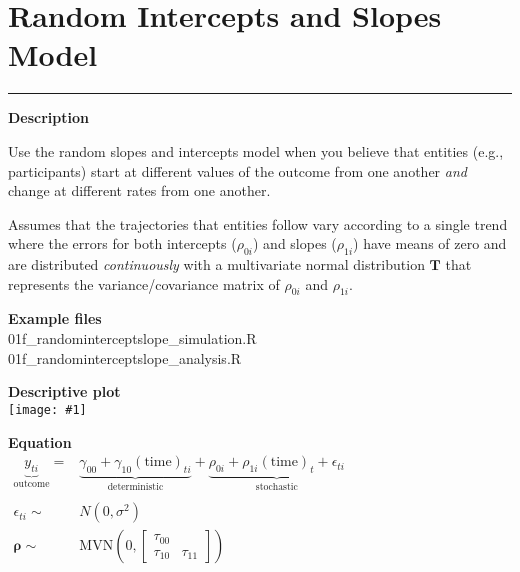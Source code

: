 \documentclass[10pt, landscape, article]{memoir}
\newcommand{\outcome}[1]{\underbrace{#1}_{\text{outcome}}}
\newcommand{\deterministic}[1]{\underbrace{#1}_{\text{deterministic}}}
\newcommand{\stochastic}[1]{\underbrace{#1}_{\text{stochastic}}}
\newenvironment{desc}{
    \begin{minipage}[t][.6\textheight][t]{.9\textwidth}
    \setlength{\parskip}{.5\baselineskip}
    \textbf{\large Description}\\\raggedright
}{
    \end{minipage}
}
\newenvironment{eqn}{
    \begin{minipage}[t][.39\textheight][t]{\textwidth}
    \textbf{\large Equation}\\
}{
    \end{minipage}
}
\newcommand{\datafig}[1]{
    \begin{minipage}[t][.6\textheight][t]{\textwidth}%
    \textbf{\large Descriptive plot}\\
    \texttt{[image: \#1]}%
    \end{minipage}
}
\newenvironment{files}{
    \begin{minipage}[t][.2\textheight][t]{\textwidth}
    \textbf{\large Example files}\\
}{
    \end{minipage}
}
\begin{document}
\chapter{Random Intercepts and Slopes Model}
\label{full}
\rule[\baselineskip]{\textwidth}{3pt}
\begin{minipage}[t][.9\textheight][t]{.4\textwidth}
\begin{desc}
Use the random slopes and intercepts model when you believe that entities (e.g., participants) start at different values of the outcome from one another \emph{and} change at different rates from one another. 

Assumes that the trajectories that entities follow vary according to a single trend where the errors for both intercepts ($\rho_{0i}$) and slopes ($\rho_{1i}$) have means of zero and are distributed \emph{continuously} with a multivariate normal distribution $\mathbf{T}$ that represents the variance\slash covariance matrix of $\rho_{0i}$ and $\rho_{1i}$. 
\end{desc}
\begin{files}
01f\_randominterceptslope\_simulation.R\\01f\_randominterceptslope\_analysis.R
\end{files}
\end{minipage} %
\begin{minipage}[t][.9\textheight][t]{.6\textwidth}
\datafig{random_intercepts_slopes.pdf}
\begin{eqn}
$\begin{array}{rl}
\outcome{y_{ti}} = & 
\deterministic{\gamma_{00} + \gamma_{10}(\text{time})_{ti}} + 
\stochastic{\rho_{0i}  + \rho_{1i}(\text{time})_{t} + \epsilon_{ti}} \\
&\\
\epsilon_{ti} \sim & N(0, \sigma^2) \\
\mathbf{\rho} \sim & \text{MVN}\left(0, \begin{bmatrix}\tau_{00} & \\ \tau_{10} & \tau_{11}\end{bmatrix}\right)
\end{array}$
\end{eqn}
\end{minipage}

\end{document}
